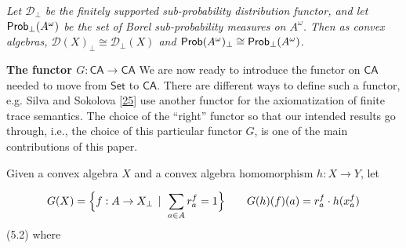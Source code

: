 \hypertarget{html:S5.Thmtheorem4.p1}{} \emph{Let %
\hypertarget{html:S5.Thmtheorem4.p1.m1}{}\({{\mathcal{D}}_{\bot}}\) be the finitely supported sub-probability distribution functor, and let %
\hypertarget{html:S5.Thmtheorem4.p1.m2}{}\({\text{\sf Prob}_{\bot}(A^{\omega})}\) be the set of Borel sub-probability measures on %
\hypertarget{html:S5.Thmtheorem4.p1.m3}{}\({A^{\omega}}\). Then as convex algebras, %
\hypertarget{html:S5.Thmtheorem4.p1.m4}{}\({{\mathcal{D}}(X)_{\bot}\cong{\mathcal{D}}_{\bot}(X)}\) and %
\hypertarget{html:S5.Thmtheorem4.p1.m5}{}\({\text{\sf Prob}(A^{\omega})_{\bot}\cong\text{\sf Prob}_{\bot}(A^{\omega})}\).}
\par\medskip
\hypertarget{html:S5.SS0.SSS0.Px1}{} \par\noindent\textbf{The functor %
\hypertarget{html:S5.SS0.SSS0.Px1.m1}{}\({G:\mathsf{CA}\to\mathsf{CA}}\)}\quad  %
\hypertarget{html:S5.SS0.SSS0.Px1.p1}{} We are now ready to introduce the functor on %
\hypertarget{html:S5.SS0.SSS0.Px1.p1.m1}{}\({\mathsf{CA}}\) needed to move from %
\hypertarget{html:S5.SS0.SSS0.Px1.p1.m2}{}\({\mathsf{Set}}\) to %
\hypertarget{html:S5.SS0.SSS0.Px1.p1.m3}{}\({\mathsf{CA}}\). There are different ways to define such a functor, e.g. Silva and Sokolova [\hyperlink{html:bib.bib25}{25}] use another functor for the axiomatization of finite trace semantics. The choice of the “right” functor so that our intended results go through, i.e., the choice of this particular functor %
\hypertarget{html:S5.SS0.SSS0.Px1.p1.m4}{}\({G}\), is one of the main contributions of this paper.
\par\medskip
\hypertarget{html:S5.SS0.SSS0.Px1.p2}{} Given a convex algebra %
\hypertarget{html:S5.SS0.SSS0.Px1.p2.m1}{}\({X}\) and a convex algebra homomorphism %
\hypertarget{html:S5.SS0.SSS0.Px1.p2.m2}{}\({h\colon X\to Y}\), let
\par\medskip
\hypertarget{html:S5.E2}{}   %
\hypertarget{html:S5.E2.m1}{}\[G(X)=\Big{\{}f:A\to X_{\bot}\,\mid\ \sum_{a\in A}r_{a}^{f}=1\Big{\}}\qquad G(h)(f)(a)=r_{a}^{f}\cdot h(x_{a}^{f})\]  (5.2)   where %
